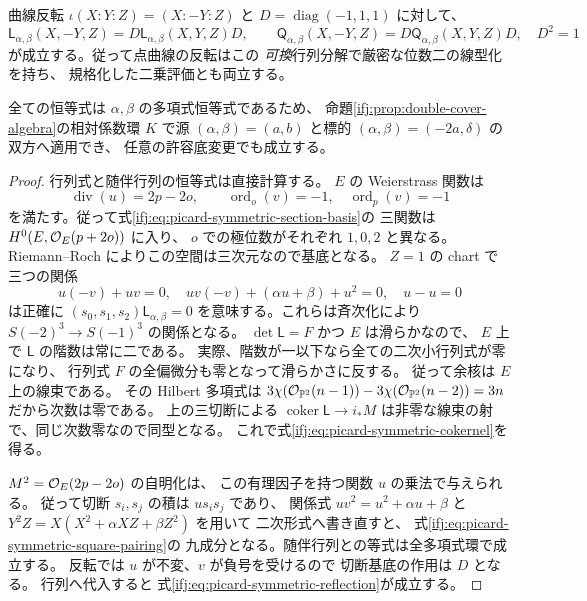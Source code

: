 \begin{proposition}
曲線反転 $\iota(X:Y:Z)=(X:-Y:Z)$ と
$D=\operatorname{diag}(-1,1,1)$ に対して、
\begin{equation}\label{ifj:eq:picard-symmetric-reflection}
 \mathsf L_{\alpha,\beta}(X,-Y,Z)
     =D\mathsf L_{\alpha,\beta}(X,Y,Z)D,
 \qquad
 \mathsf Q_{\alpha,\beta}(X,-Y,Z)
     =D\mathsf Q_{\alpha,\beta}(X,Y,Z)D,\quad D^2=1
\end{equation}
が成立する。従って点曲線の反転はこの
\emph{可換}行列分解で厳密な位数二の線型化を持ち、
規格化した二乗評価とも両立する。

全ての恒等式は $\alpha,\beta$ の多項式恒等式であるため、
命題\ref{ifj:prop:double-cover-algebra}の相対係数環 $K$
で源 $(\alpha,\beta)=(a,b)$ と標的
$(\alpha,\beta)=(-2a,\delta)$ の双方へ適用でき、
任意の許容底変更でも成立する。
\end{proposition}

\begin{proof}
行列式と随伴行列の恒等式は直接計算する。
$E$ の Weierstrass 関数は
\[
 \operatorname{div}(u)=2p-2o,\qquad
 \operatorname{ord}_o(v)=-1,\quad
 \operatorname{ord}_p(v)=-1
\]
を満たす。従って式\eqref{ifj:eq:picard-symmetric-section-basis}の
三関数は $H^0(E,\mathcal O_E(p+2o))$ に入り、
$o$ での極位数がそれぞれ $1,0,2$ と異なる。
Riemann--Roch によりこの空間は三次元なので基底となる。
$Z=1$ の chart で三つの関係
\[
 u(-v)+uv=0,\quad
 uv(-v)+(\alpha u+\beta)+u^2=0,\quad
 u-u=0
\]
は正確に $(s_0,s_1,s_2)\mathsf L_{\alpha,\beta}=0$
を意味する。これらは斉次化により
$S(-2)^3\to S(-1)^3$ の関係となる。
$\det\mathsf L=F$ かつ $E$ は滑らかなので、
$E$ 上で $\mathsf L$ の階数は常に二である。
実際、階数が一以下なら全ての二次小行列式が零になり、
行列式 $F$ の全偏微分も零となって滑らかさに反する。
従って余核は $E$ 上の線束である。
その Hilbert 多項式は
$3\chi(\mathcal O_{\mathbb P^2}(n-1))
 -3\chi(\mathcal O_{\mathbb P^2}(n-2))=3n$
だから次数は零である。
上の三切断による $\operatorname{coker}\mathsf L\to i_*M$
は非零な線束の射で、同じ次数零なので同型となる。
これで式\eqref{ifj:eq:picard-symmetric-cokernel}を得る。

$M^2=\mathcal O_E(2p-2o)$ の自明化は、
この有理因子を持つ関数 $u$ の乗法で与えられる。
従って切断 $s_i,s_j$ の積は $us_is_j$ であり、
関係式 $uv^2=u^2+\alpha u+\beta$ と
$Y^2Z=X(X^2+\alpha XZ+\beta Z^2)$ を用いて
二次形式へ書き直すと、
式\eqref{ifj:eq:picard-symmetric-square-pairing}の
九成分となる。随伴行列との等式は全多項式環で成立する。
反転では $u$ が不変、$v$ が負号を受けるので
切断基底の作用は $D$ となる。
行列へ代入すると
式\eqref{ifj:eq:picard-symmetric-reflection}が成立する。
\end{proof}


